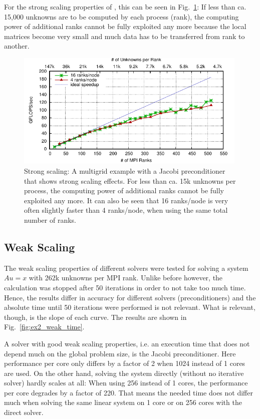 For the strong scaling properties of , this can be seen in Fig.~\ref{fig:res_ex48}: If less than ca. 15,000 unknowns are to be computed by each process (rank), the computing power of additional ranks cannot be fully exploited any more because the local matrices become very small and much data has to be transferred from rank to another.

\begin{figure}[tb]
	\centering
	\includegraphics[width=0.99\textwidth]{ex48}
	\caption{Strong scaling: A multigrid example with a Jacobi preconditioner that shows strong scaling effects. For less than ca. 15k unknowns per process, the computing power of additional ranks cannot be fully exploited any more. It can also be seen that 16 ranks/node is very often slightly faster than 4 ranks/node, when using the same total number of ranks.} 
	\label{fig:res_ex48}
\end{figure}



\subsection{Weak Scaling}

The weak scaling properties of different solvers were tested for solving a system $Au = x$ with 262k unknowns per MPI rank. Unlike before however, the calculation was stopped after 50 iterations in order to not take too much time. Hence, the results differ in accuracy for different solvers (preconditioners) and the absolute time until 50 iterations were performed is not relevant. What is relevant, though, is the slope of each curve. The results are shown in Fig.~\ref{fig:ex2_weak_time}. 

A solver with good weak scaling properties, i.e. an execution time that does not depend much on the global problem size, is the Jacobi preconditioner. Here performance per core only differs by a factor of 2 when 1024 instead of 1 cores are used. On the other hand, solving the system directly (without no iterative solver) hardly scales at all: When using 256 instead of 1 cores, the performance per core degrades by a factor of 220. That means the needed time does not differ much when solving the same linear system on 1 core or on 256 cores with the direct solver.


